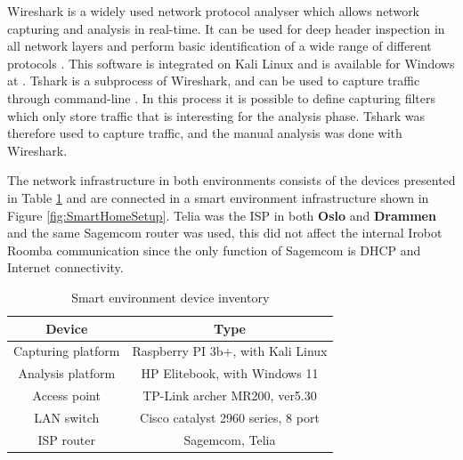 Wireshark \cite{wireshark} is a widely used network protocol analyser which allows network capturing and analysis in real-time. It can be used for deep header inspection in all network layers and perform basic identification of a wide range of different protocols \cite{wireshark}. This software is integrated on Kali Linux and is available for Windows at \cite{wireshark_download_2016}. Tshark is a subprocess of Wireshark, and can be used to capture traffic through command-line . In this process it is possible to define capturing filters which only store traffic that is interesting for the analysis phase. Tshark was therefore used to capture traffic, and the manual analysis was done with Wireshark.

The network infrastructure in both environments consists of the devices presented in Table \ref{tab:networkdevices} and are connected in a smart environment infrastructure shown in Figure \ref{fig:SmartHomeSetup}. Telia was the \gls{ISP} in both \textbf{Oslo} and \textbf{Drammen} and the same Sagemcom router was used, this did not affect the internal Irobot Roomba communication since the only function of Sagemcom is \gls{DHCP} and Internet connectivity. 

\begin{table}[H]
\centering
\caption{Smart environment device inventory}
\label{tab:networkdevices}
\begin{tabular}{|c|c|}
\hline
\textbf{Device}    & \textbf{Type}                      \\ \hline
Capturing platform & Raspberry PI 3b+, with Kali Linux  \\ \hline
Analysis platform  & HP Elitebook, with Windows 11      \\ \hline
Access point       & TP-Link archer MR200, ver5.30      \\ \hline
\gls{LAN} switch         & Cisco catalyst 2960 series, 8 port \\ \hline
\gls{ISP} router         & Sagemcom, Telia                    \\ \hline
\end{tabular}
\end{table}



